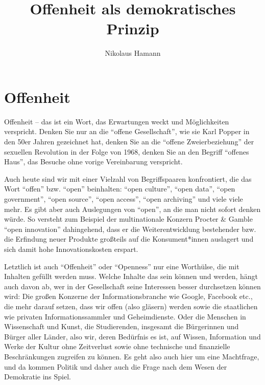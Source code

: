 \documentclass[a4paper,
fontsize=11pt,
oneside,
numbers=noperiodatend,
parskip=half-,
bibliography=totoc,
final
]{scrartcl}
\title{\LARGE{Offenheit als demokratisches Prinzip}} %
\author{Nikolaus Hamann} %
\date{}
\begin{document}
\maketitle
\thispagestyle{fancyplain} 



\hypertarget{offenheit}{%
\section*{Offenheit}\label{offenheit}}

Offenheit -- das ist ein Wort, das Erwartungen weckt und Möglichkeiten
verspricht. Denken Sie nur an die \enquote{offene Gesellschaft}, wie sie
Karl Popper in den 50er Jahren gezeichnet hat, denken Sie an die
\enquote{offene Zweierbeziehung} der sexuellen Revolution in der Folge
von 1968, denken Sie an den Begriff \enquote{offenes Haus}, das Besuche
ohne vorige Vereinbarung verspricht.

Auch heute sind wir mit einer Vielzahl von Begriffspaaren konfrontiert,
die das Wort \enquote{offen} bzw. \enquote{open} beinhalten:
\enquote{open culture}, \enquote{open data}, \enquote{open government},
\enquote{open source}, \enquote{open access}, \enquote{open archiving}
und viele viele mehr. Es gibt aber auch Auslegungen von \enquote{open},
an die man nicht sofort denken würde. So versteht zum Beispiel der
multinationale Konzern Procter \& Gamble \enquote{open innovation}
dahingehend, dass er die Weiterentwicklung bestehender bzw. die
Erfindung neuer Produkte großteils auf die Konsument*innen auslagert und
sich damit hohe Innovationskosten erspart.

Letztlich ist auch \enquote{Offenheit} oder \enquote{Openness} nur eine
Worthülse, die mit Inhalten gefüllt werden muss. Welche Inhalte das sein
können und werden, hängt auch davon ab, wer in der Gesellschaft seine
Interessen besser durchsetzen können wird: Die großen Konzerne der
Informationsbranche wie Google, Facebook etc., die mehr darauf setzen,
dass {wir} offen (also gläsern) werden sowie die staatlichen wie
privaten Informationssammler und Geheimdienste. Oder die Menschen in
Wissenschaft und Kunst, die Studierenden, insgesamt die Bürgerinnen und
Bürger aller Länder, also wir, deren Bedürfnis es ist, auf Wissen,
Information und Werke der Kultur ohne Zeitverlust sowie ohne technische
und finanzielle Beschränkungen zugreifen zu können. Es geht also auch
hier um eine Machtfrage, und da kommen Politik und daher auch die Frage
nach dem Wesen der Demokratie ins Spiel.
\end{document}
